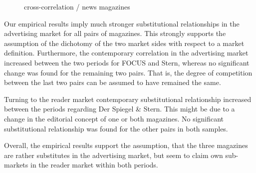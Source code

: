 \documentclass[12pt,a4paper,notitlepage]{article}
\begin{document}
\begin{figure}[H]\centering
\caption{cross-correlation / news magazines}
\label{fig_QQ_fss}
\end{figure}

Our empirical results imply much stronger substitutional relationships in the advertising market for all pairs of magazines. This strongly supports the assumption of the dichotomy of the two market sides with respect to a market definition. Furthermore, the contemporary correlation in the advertising market increased between the two periods for FOCUS and Stern, whereas no significant change was found for the remaining two pairs. That is, the degree of competition between the last two pairs can be assumed to have remained the same. 

Turning to the reader market contemporary substitutional relationship increased between the periods regarding Der Spiegel \& Stern. This might be due to a change in the editorial concept of one or both magazines. No significant substitutional relationship was found for the other pairs in both samples.  

Overall, the empirical results support the assumption, that the three magazines are rather substitutes in the advertising market, but seem to claim own sub-markets in the reader market within both periods. 
\end{document}
